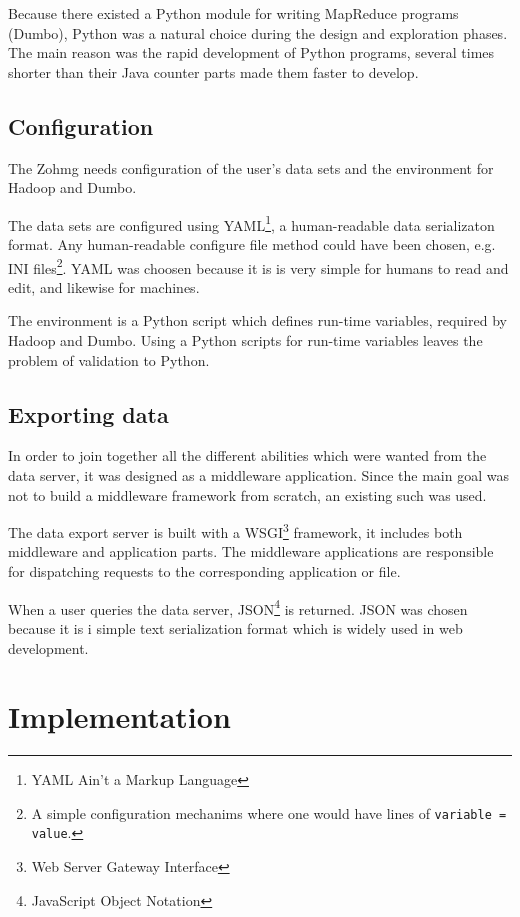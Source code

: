 Because there existed a Python module for writing MapReduce programs (Dumbo),
Python was a natural choice during the design and exploration phases. The main
reason was the rapid development of Python programs, several times shorter than
their Java counter parts made them faster to develop.


\section{Configuration}

The Zohmg needs configuration of the user's data sets and the environment for
Hadoop and Dumbo.

The data sets are configured using YAML\footnote{YAML Ain't a Markup Language},
a human-readable data serializaton format. Any human-readable configure file
method could have been chosen, e.g. INI files\footnote{A simple configuration
mechanims where one would have lines of \texttt{variable = value}.}. YAML was
choosen because it is is very simple for humans to read and edit, and likewise
for machines.

The environment is a Python script which defines run-time variables, required by
Hadoop and Dumbo. Using a Python scripts for run-time variables leaves the
problem of validation to Python.


\section{Exporting data}

In order to join together all the different abilities which were wanted from the
data server, it was designed as a middleware application. Since the main goal
was not to build a middleware framework from scratch, an existing such was used.

The data export server is built with a WSGI\footnote{Web Server Gateway
Interface} framework, it includes both middleware and application parts. The
middleware applications are responsible for dispatching requests to the
corresponding application or file.

When a user queries the data server, JSON\footnote{JavaScript Object Notation}
is returned. JSON was chosen because it is i simple text serialization format
which is widely used in web development.



\chapter{Implementation}


